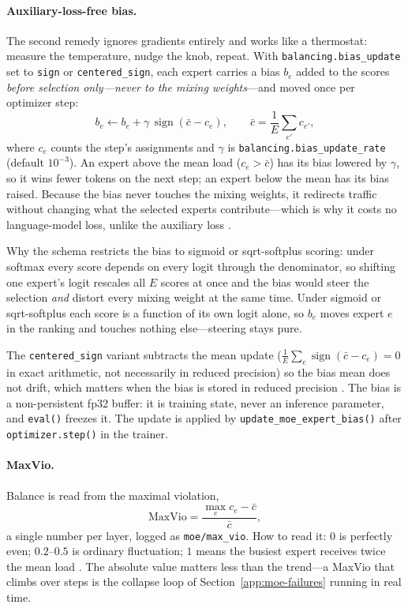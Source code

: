 \paragraph{Auxiliary-loss-free bias.}
The second remedy ignores gradients entirely and works like a thermostat:
measure the temperature, nudge the knob, repeat. With
\texttt{balancing.bias\_update} set to \texttt{sign} or
\texttt{centered\_sign}, each expert carries a bias $b_e$ added to the scores
\emph{before selection only---never to the mixing weights}---and moved once
per optimizer step:
\begin{equation}
  b_e \leftarrow b_e + \gamma\,\operatorname{sign}\!\left(\bar c - c_e\right),
  \qquad
  \bar c = \frac{1}{E}\sum_{e'} c_{e'},
  \label{eq:bias}
\end{equation}
where $c_e$ counts the step's assignments and $\gamma$ is
\texttt{balancing.bias\_update\_rate} (default $10^{-3}$). An expert above
the mean load ($c_e > \bar c$) has its bias lowered by $\gamma$, so it wins
fewer tokens on the next step; an expert below the mean has its bias raised.
Because the bias never touches the mixing weights, it redirects traffic
without changing what the selected experts contribute---which is why it
costs no language-model loss, unlike the auxiliary loss
\citep{wang2024auxfree}.

Why the schema restricts the bias to sigmoid or sqrt-softplus scoring: under
softmax every score depends on every logit through the denominator, so
shifting one expert's logit rescales all $E$ scores at once and the bias
would steer the selection \emph{and} distort every mixing weight at the same
time. Under sigmoid or sqrt-softplus each score is a function of its own
logit alone, so $b_e$ moves expert $e$ in the ranking and touches nothing
else---steering stays pure.

The \texttt{centered\_sign} variant subtracts the mean update
($\tfrac{1}{E}\sum_{e}\operatorname{sign}(\bar c - c_e) = 0$ in exact
arithmetic, not necessarily in reduced precision) so the bias mean does not
drift, which matters when the bias is stored in reduced precision
\citep{wang2024auxfree}. The bias is a non-persistent fp32 buffer: it is
training state, never an inference parameter, and \texttt{eval()} freezes it.
The update is applied by \texttt{update\_moe\_expert\_bias()} after
\texttt{optimizer.step()} in the trainer.

\paragraph{MaxVio.}
Balance is read from the maximal violation,
\begin{equation}
  \mathrm{MaxVio} = \frac{\max_e c_e - \bar c}{\bar c},
\end{equation}
a single number per layer, logged as \texttt{moe/max\_vio}. How to read it:
$0$ is perfectly even; $0.2$--$0.5$ is ordinary fluctuation; $1$ means the
busiest expert receives twice the mean load \citep{wang2024auxfree}. The
absolute value matters less than the trend---a MaxVio that climbs over
steps is the collapse loop of Section~\ref{app:moe-failures} running in
real time.

